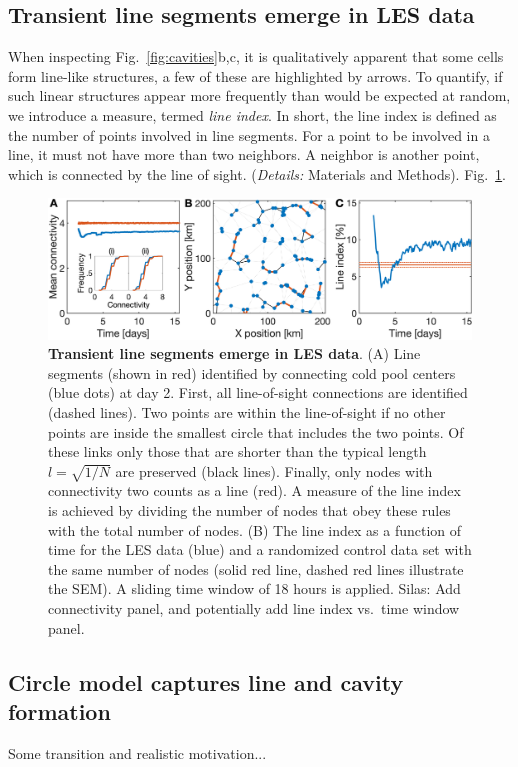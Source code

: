 \documentclass[reprint,amsmath,amssymb]{revtex4-1}
\begin{document}
\subsection{Transient line segments emerge in LES data}
When inspecting Fig.~\ref{fig:cavities}b,c, it is qualitatively apparent that some cells form line-like structures, a few of these are highlighted by arrows. 
To quantify, if such linear structures appear more frequently than would be expected at random, we introduce a measure, termed {\it line index}. 
In short, the line index is defined as the number of points involved in line segments. 
For a point to be involved in a line, it must not have more than two neighbors. 
A neighbor is another point, which is connected by the line of sight. ({\it Details:} Materials and Methods).
Fig.~\ref{fig:lines}.

\begin{figure}
\centering
\includegraphics[height=0.3\linewidth]{linesNew}
\caption{{\bf Transient line segments emerge in LES data}. (A) Line segments (shown in red) identified by connecting cold pool centers (blue dots) at day 2. First, all line-of-sight connections are identified (dashed lines). Two points are within the line-of-sight if no other points are inside the smallest circle that includes the two points. Of these links only those that are shorter than the typical length $l=\sqrt{1/N}$ are preserved (black lines). Finally, only nodes with connectivity two counts as a line (red). A measure of the line index is achieved by dividing the number of nodes that obey these rules with the total number of nodes. (B) The line index as a function of time for the LES data (blue) and a randomized control data set with the same number of nodes (solid red line, dashed red lines illustrate the SEM). A sliding time window of 18 hours is applied. {\color{red} Silas: Add connectivity panel, and potentially add line index vs.~time window panel.}}
\label{fig:lines}
\end{figure}

\subsection{Circle model captures line and cavity formation}
Some transition and realistic motivation...
\end{document}
